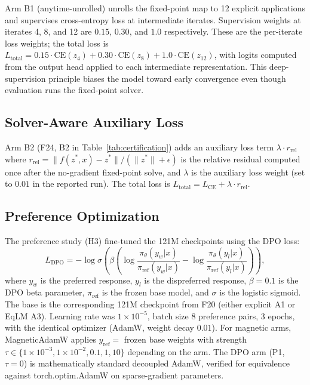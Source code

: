 Arm B1 (anytime-unrolled) unrolls the fixed-point map to 12 explicit applications and supervises cross-entropy loss at intermediate iterates. Supervision weights at iterates 4, 8, and 12 are $0.15$, $0.30$, and $1.0$ respectively. These are the per-iterate loss weights; the total loss is $L_{\text{total}} = 0.15 \cdot \text{CE}(z_4) + 0.30 \cdot \text{CE}(z_8) + 1.0 \cdot \text{CE}(z_{12})$, with logits computed from the output head applied to each intermediate representation. This deep-supervision principle biases the model toward early convergence even though evaluation runs the fixed-point solver.

\subsection{Solver-Aware Auxiliary Loss}

Arm B2 (F24, B2 in Table~\ref{tab:certification}) adds an auxiliary loss term $\lambda \cdot r_{\text{rel}}$ where $r_{\text{rel}} = \lVert f(z^*, x) - z^* \rVert / (\lVert z^* \rVert + \epsilon)$ is the relative residual computed once after the no-gradient fixed-point solve, and $\lambda$ is the auxiliary loss weight (set to $0.01$ in the reported run). The total loss is $L_{\text{total}} = L_{\text{CE}} + \lambda \cdot r_{\text{rel}}$.

\subsection{Preference Optimization}

The preference study (H3) fine-tuned the 121M checkpoints using the DPO loss:
\[ L_{\text{DPO}} = -\log \sigma\left(\beta \left( \log \frac{\pi_\theta(y_w | x)}{\pi_{\text{ref}}(y_w | x)} - \log \frac{\pi_\theta(y_l | x)}{\pi_{\text{ref}}(y_l | x)} \right) \right), \]
where $y_w$ is the preferred response, $y_l$ is the dispreferred response, $\beta = 0.1$ is the DPO beta parameter, $\pi_{\text{ref}}$ is the frozen base model, and $\sigma$ is the logistic sigmoid. The base is the corresponding 121M checkpoint from F20 (either explicit A1 or EqLM A3). Learning rate was $1 \times 10^{-5}$, batch size 8 preference pairs, 3 epochs, with the identical optimizer (AdamW, weight decay $0.01$). For magnetic arms, MagneticAdamW applies $y_{\text{ref}} = $ frozen base weights with strength $\tau \in \{1 \times 10^{-3}, 1 \times 10^{-2}, 0.1, 1, 10\}$ depending on the arm. The DPO arm (P1, $\tau = 0$) is mathematically standard decoupled AdamW, verified for equivalence against torch.optim.AdamW on sparse-gradient parameters.

